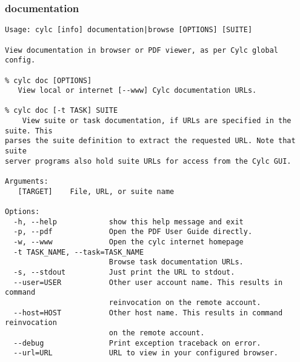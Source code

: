 \subsubsection{documentation}
\label{documentation}
\begin{lstlisting}
Usage: cylc [info] documentation|browse [OPTIONS] [SUITE]

View documentation in browser or PDF viewer, as per Cylc global config.

% cylc doc [OPTIONS]
   View local or internet [--www] Cylc documentation URLs.

% cylc doc [-t TASK] SUITE
    View suite or task documentation, if URLs are specified in the suite. This
parses the suite definition to extract the requested URL. Note that suite
server programs also hold suite URLs for access from the Cylc GUI.

Arguments:
   [TARGET]    File, URL, or suite name

Options:
  -h, --help            show this help message and exit
  -p, --pdf             Open the PDF User Guide directly.
  -w, --www             Open the cylc internet homepage
  -t TASK_NAME, --task=TASK_NAME
                        Browse task documentation URLs.
  -s, --stdout          Just print the URL to stdout.
  --user=USER           Other user account name. This results in command
                        reinvocation on the remote account.
  --host=HOST           Other host name. This results in command reinvocation
                        on the remote account.
  --debug               Print exception traceback on error.
  --url=URL             URL to view in your configured browser.
\end{lstlisting}
